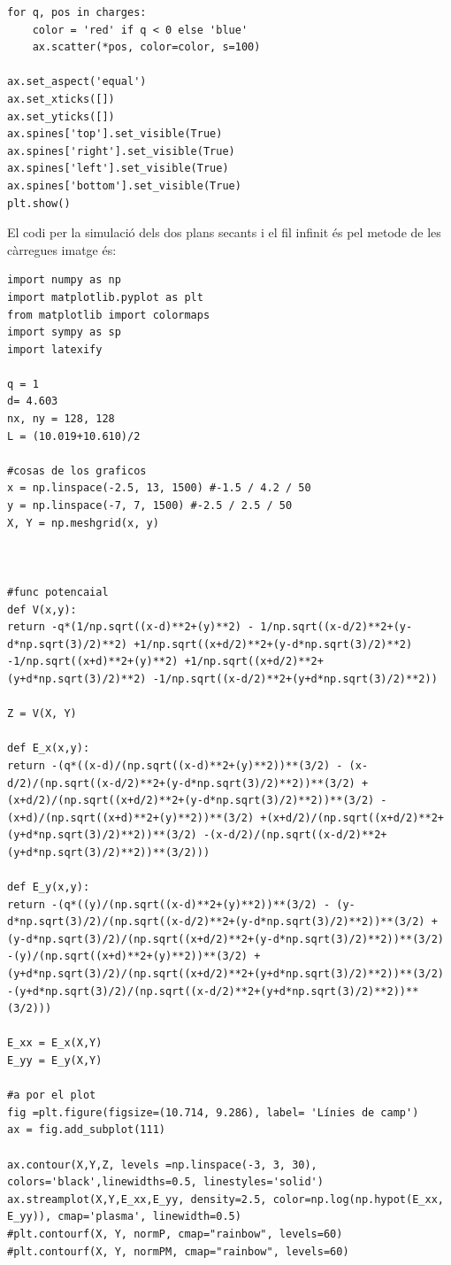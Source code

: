 \documentclass[a4paper,10.5pt]{report}
\begin{document}
\begin{appendices}
\begin{lstlisting}
for q, pos in charges:
    color = 'red' if q < 0 else 'blue'
    ax.scatter(*pos, color=color, s=100)

ax.set_aspect('equal')
ax.set_xticks([])
ax.set_yticks([])
ax.spines['top'].set_visible(True)
ax.spines['right'].set_visible(True)
ax.spines['left'].set_visible(True)
ax.spines['bottom'].set_visible(True)
plt.show()
\end{lstlisting}

El codi per la simulació dels dos plans secants i el fil infinit és pel metode de les càrregues imatge és:
\begin{lstlisting}
import numpy as np
import matplotlib.pyplot as plt
from matplotlib import colormaps
import sympy as sp
import latexify

q = 1
d= 4.603
nx, ny = 128, 128
L = (10.019+10.610)/2

#cosas de los graficos
x = np.linspace(-2.5, 13, 1500) #-1.5 / 4.2 / 50
y = np.linspace(-7, 7, 1500) #-2.5 / 2.5 / 50
X, Y = np.meshgrid(x, y)



#func potencaial
def V(x,y):
return -q*(1/np.sqrt((x-d)**2+(y)**2) - 1/np.sqrt((x-d/2)**2+(y-d*np.sqrt(3)/2)**2) +1/np.sqrt((x+d/2)**2+(y-d*np.sqrt(3)/2)**2) -1/np.sqrt((x+d)**2+(y)**2) +1/np.sqrt((x+d/2)**2+(y+d*np.sqrt(3)/2)**2) -1/np.sqrt((x-d/2)**2+(y+d*np.sqrt(3)/2)**2))

Z = V(X, Y)

def E_x(x,y):
return -(q*((x-d)/(np.sqrt((x-d)**2+(y)**2))**(3/2) - (x-d/2)/(np.sqrt((x-d/2)**2+(y-d*np.sqrt(3)/2)**2))**(3/2) +(x+d/2)/(np.sqrt((x+d/2)**2+(y-d*np.sqrt(3)/2)**2))**(3/2) -(x+d)/(np.sqrt((x+d)**2+(y)**2))**(3/2) +(x+d/2)/(np.sqrt((x+d/2)**2+(y+d*np.sqrt(3)/2)**2))**(3/2) -(x-d/2)/(np.sqrt((x-d/2)**2+(y+d*np.sqrt(3)/2)**2))**(3/2)))

def E_y(x,y):
return -(q*((y)/(np.sqrt((x-d)**2+(y)**2))**(3/2) - (y-d*np.sqrt(3)/2)/(np.sqrt((x-d/2)**2+(y-d*np.sqrt(3)/2)**2))**(3/2) +(y-d*np.sqrt(3)/2)/(np.sqrt((x+d/2)**2+(y-d*np.sqrt(3)/2)**2))**(3/2) -(y)/(np.sqrt((x+d)**2+(y)**2))**(3/2) +(y+d*np.sqrt(3)/2)/(np.sqrt((x+d/2)**2+(y+d*np.sqrt(3)/2)**2))**(3/2) -(y+d*np.sqrt(3)/2)/(np.sqrt((x-d/2)**2+(y+d*np.sqrt(3)/2)**2))**(3/2)))

E_xx = E_x(X,Y)
E_yy = E_y(X,Y)

#a por el plot
fig =plt.figure(figsize=(10.714, 9.286), label= 'Línies de camp') 
ax = fig.add_subplot(111)

ax.contour(X,Y,Z, levels =np.linspace(-3, 3, 30), colors='black',linewidths=0.5, linestyles='solid')
ax.streamplot(X,Y,E_xx,E_yy, density=2.5, color=np.log(np.hypot(E_xx, E_yy)), cmap='plasma', linewidth=0.5)
#plt.contourf(X, Y, normP, cmap="rainbow", levels=60)
#plt.contourf(X, Y, normPM, cmap="rainbow", levels=60)



\end{lstlisting}
\end{appendices}
\end{document}
